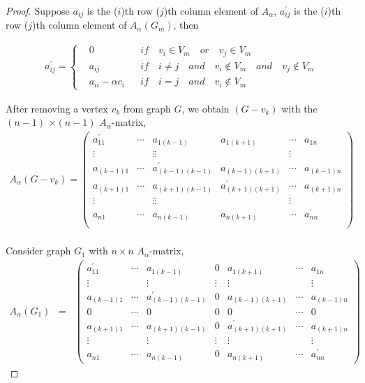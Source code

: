 \documentclass[amsthm]{elsart}
\begin{document}
\begin{proof}
Suppose $a_{ij}$ is the ($i$)th row ($j$)th column element of $A_\alpha$,  $a_{ij}^{\prime}$ is the ($i$)th row ($j$)th column element of $A_\alpha(G_m)$, then

\begin{eqnarray*}
 a_{ij}^{\prime} =
\left\{
\begin{aligned}
&0    && if \quad v_i \in V_m \quad or \quad v_j \in V_m \\
&a_{ij}    && if \quad i \neq j  \quad and \quad v_i \notin V_m  \quad and \quad v_j \notin V_m \\
&a_{ii} - \alpha c_i    && if \quad i = j \quad and \quad v_i \notin V_m
\end{aligned}
\right.
\end{eqnarray*}

After removing a vertex $v_k$ from graph $G$, we obtain $(G - v_k)$
 with the  $(n - 1)$ $ \times (n - 1)$ $A_\alpha$-matrix, \\

\begin{eqnarray*}
A_\alpha(G - v_k) =
\begin{pmatrix}
a_{11}^{\prime} & \cdots & a_{1(k-1)} & a_{1(k+1)} & \cdots & a_{1n}\\
\vdots & {} & \vdots \vdots & {} & \vdots \\
a_{(k-1)1} & \cdots & a_{(k-1)(k-1)}^{\prime} & a_{(k-1)(k+1)} & \cdots & a_{(k-1)n}\\
a_{(k+1)1} & \cdots & a_{(k+1)(k-1)} & a_{(k+1)(k+1)}^{\prime} & \cdots & a_{(k+1)n}\\
\vdots & {} & \vdots \vdots & {} & \vdots \\
a_{n1} & \cdots & a_{n(k-1)} & a_{n(k+1)} & \cdots & a_{nn}^{\prime}\\
\end{pmatrix} \\
\end{eqnarray*}

Consider graph $G_1$ with $n \times n$ $A_\alpha$-matrix, \\
\begin{eqnarray} \label{matrix:G1}
A_\alpha(G_1) \;\;=\;\;
\begin{pmatrix}
a_{11}^{\prime} & \cdots & a_{1(k-1)} & 0 & a_{1(k+1)} & \cdots & a_{1n} \\
\vdots & {} & \vdots & \vdots & \vdots & {} & \vdots \\
a_{(k-1)1} & \cdots & a_{(k-1)(k-1)}^{\prime} & 0 & a_{(k-1)(k+1)} & \cdots & a_{(k-1)n} \\
0 & \cdots & 0 & 0 & 0 & \cdots & 0 \\
a_{(k+1)1} & \cdots & a_{(k+1)(k-1)} & 0 & a_{(k+1)(k+1)}^{\prime} & \cdots & a_{(k+1)n} \\
\vdots & {} & \vdots & \vdots & \vdots & {} & \vdots \\
a_{n1} & \cdots & a_{n(k-1)} & 0 & a_{n(k+1)} & \cdots & a_{nn}^{\prime}
\end{pmatrix}
\end{eqnarray}


\end{proof}
\end{document}
